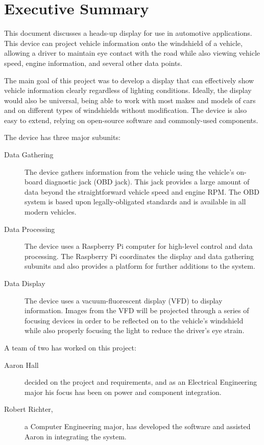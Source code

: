\chapter{Executive Summary}


This document discusses a heads-up display for use in automotive applications.
This device can project vehicle information onto the
windshield of a vehicle, allowing a driver to maintain eye contact
with the road while also viewing vehicle speed, engine information, and
several other data points.

The main goal of this project was to develop a display that can
effectively show vehicle information clearly regardless of
lighting conditions. Ideally, the display would also be universal, being able
to work with most makes and models of cars and on
different types of windshields without modification. The device is also
easy to extend, relying on open-source software and commonly-used components.

The device has three major subunits:

\begin{description}
\item[Data Gathering] The device gathers information from the
vehicle using the vehicle's on-board diagnostic jack (OBD jack). This jack
provides a large amount of data beyond the straightforward vehicle speed and
engine RPM. The OBD system is based upon legally-obligated standards and is
available in all modern vehicles.
\item[Data Processing] The device uses a Raspberry Pi computer for high-level
control and data processing. The Raspberry Pi coordinates the display and
data gathering subunits and also provides a platform for further additions to
the system. 
\item[Data Display] The device uses a vacuum-fluorescent display (VFD) to
display information. Images from the VFD will be projected through a series of
focusing devices in order to be reflected on to the vehicle's windshield while
also properly focusing the light to reduce the driver's eye strain.
\end{description}

A team of two has worked on this project:

\begin{description}
\item[Aaron Hall] decided on the project and requirements, and as an Electrical
Engineering major his focus has been on power and component integration.
\item[Robert Richter,] a Computer Engineering
major, has developed the software and assisted Aaron in integrating the system.
\end{description}
